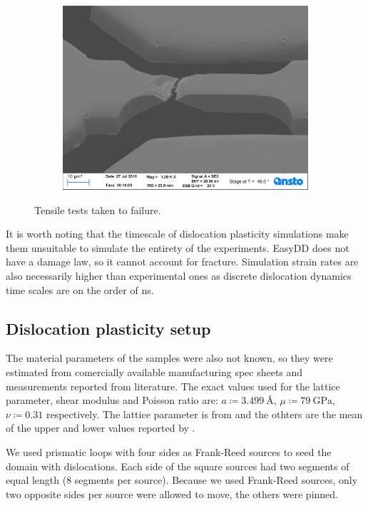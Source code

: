 \begin{figure}
\begin{subfigure}[t]{0.3\linewidth}
        \includegraphics[width=\linewidth]{../data/Ni039.jpg}
    \end{subfigure}
    \caption{Tensile tests taken to failure.}
    \label{f:tensileFailure}
\end{figure}

It is worth noting that the timescale of dislocation plasticity simulations make them unsuitable to simulate the entirety of the experiments. EasyDD does not have a damage law, so it cannot account for fracture. Simulation strain rates are also necessarily higher than experimental ones as discrete dislocation dynamics time scales are on the order of \si{\nano\second}.

\subsection{Dislocation plasticity setup}
\label{ss:modelSetup}

The material parameters of the samples were also not known, so they were estimated from comercially available manufacturing spec sheets and measurements reported from literature. The exact values used for the lattice parameter, shear modulus and Poisson ratio are: $a \coloneqq \SI{3.499}{\angstrom}$, $ \mu  \coloneqq \SI{79}{\giga\pascal}$, $\nu \coloneqq 0.31$ respectively. The lattice parameter is from \cite{ni_lattice} and the othters are the mean of the upper and lower values reported by \cite{azom_nickel}.

We used prismatic loops with four sides as Frank-Reed sources to seed the domain with dislocations. Each side of the square sources had two segments of equal length (8 segments per source). Because we used Frank-Reed sources, only two opposite sides per source were allowed to move, the others were pinned.

